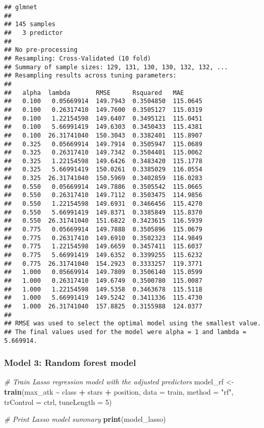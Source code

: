 \documentclass[
]{article}
\newenvironment{Shaded}{\begin{snugshade}}{\end{snugshade}}
\newcommand{\AttributeTok}[1]{\textcolor[rgb]{0.13,0.29,0.53}{#1}}
\newcommand{\CommentTok}[1]{\textcolor[rgb]{0.56,0.35,0.01}{\textit{#1}}}
\newcommand{\DecValTok}[1]{\textcolor[rgb]{0.00,0.00,0.81}{#1}}
\newcommand{\FunctionTok}[1]{\textcolor[rgb]{0.13,0.29,0.53}{\textbf{#1}}}
\newcommand{\NormalTok}[1]{#1}
\newcommand{\OtherTok}[1]{\textcolor[rgb]{0.56,0.35,0.01}{#1}}
\newcommand{\SpecialCharTok}[1]{\textcolor[rgb]{0.81,0.36,0.00}{\textbf{#1}}}
\newcommand{\StringTok}[1]{\textcolor[rgb]{0.31,0.60,0.02}{#1}}
\begin{document}
\begin{verbatim}
## glmnet 
## 
## 145 samples
##   3 predictor
## 
## No pre-processing
## Resampling: Cross-Validated (10 fold) 
## Summary of sample sizes: 129, 131, 130, 130, 132, 132, ... 
## Resampling results across tuning parameters:
## 
##   alpha  lambda       RMSE      Rsquared   MAE     
##   0.100   0.05669914  149.7943  0.3504850  115.0645
##   0.100   0.26317410  149.7600  0.3505127  115.0319
##   0.100   1.22154598  149.6407  0.3495121  115.0451
##   0.100   5.66991419  149.6303  0.3450433  115.4381
##   0.100  26.31741040  150.3043  0.3382401  115.8907
##   0.325   0.05669914  149.7914  0.3505947  115.0689
##   0.325   0.26317410  149.7342  0.3504401  115.0062
##   0.325   1.22154598  149.6426  0.3483420  115.1778
##   0.325   5.66991419  150.0261  0.3385029  116.0554
##   0.325  26.31741040  150.5969  0.3402859  116.0283
##   0.550   0.05669914  149.7886  0.3505542  115.0665
##   0.550   0.26317410  149.7112  0.3503475  114.9856
##   0.550   1.22154598  149.6931  0.3466456  115.4270
##   0.550   5.66991419  149.8371  0.3385849  115.8370
##   0.550  26.31741040  151.6822  0.3423615  116.5939
##   0.775   0.05669914  149.7888  0.3505896  115.0679
##   0.775   0.26317410  149.6910  0.3502323  114.9849
##   0.775   1.22154598  149.6659  0.3457411  115.6037
##   0.775   5.66991419  149.6352  0.3399255  115.6232
##   0.775  26.31741040  154.2923  0.3333257  119.3771
##   1.000   0.05669914  149.7809  0.3506140  115.0599
##   1.000   0.26317410  149.6749  0.3500780  115.0087
##   1.000   1.22154598  149.5358  0.3463678  115.5118
##   1.000   5.66991419  149.5242  0.3411336  115.4730
##   1.000  26.31741040  157.8825  0.3155988  124.0377
## 
## RMSE was used to select the optimal model using the smallest value.
## The final values used for the model were alpha = 1 and lambda = 5.669914.
\end{verbatim}

\subsubsection{Model 3: Random forest
model}\label{model-3-random-forest-model}

\begin{Shaded}
\begin{Highlighting}[]
\CommentTok{\# Train Lasso regression model with the adjusted predictors}
\NormalTok{model\_rf }\OtherTok{\textless{}{-}} \FunctionTok{train}\NormalTok{(max\_atk }\SpecialCharTok{\textasciitilde{}}\NormalTok{ class }\SpecialCharTok{+}\NormalTok{ stars }\SpecialCharTok{+}\NormalTok{ position,}
                  \AttributeTok{data =}\NormalTok{ train,}
                  \AttributeTok{method =} \StringTok{"rf"}\NormalTok{,}
                  \AttributeTok{trControl =}\NormalTok{ ctrl,}
                  \AttributeTok{tuneLength =} \DecValTok{5}\NormalTok{)}


\CommentTok{\# Print Lasso model summary}
\FunctionTok{print}\NormalTok{(model\_lasso)}
\end{Highlighting}
\end{Shaded}
\end{document}
